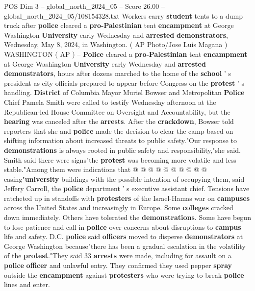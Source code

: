 \begin{textsample}{POS Dim 3 – global\_north\_2024\_05 – Score 26.00 – global\_north\_2024\_05/108154328.txt}  \label{ex:f3_pos_013}
Workers carry \textbf{student} tents to a dump truck after \textbf{police} cleared a \textbf{pro-Palestinian} tent \textbf{encampment} at George Washington \textbf{University} early Wednesday and \textbf{arrested} \textbf{demonstrators}, Wednesday, May 8, 2024, in Washington. ( AP Photo/Jose Luis Magana ) WASHINGTON ( AP ) -- \textbf{Police} cleared a \textbf{pro-Palestinian} tent \textbf{encampment} at George Washington \textbf{University} early Wednesday and \textbf{arrested} \textbf{demonstrators}, hours after dozens marched to the home of the \textbf{school} ' s president as city officials prepared to appear before Congress on the \textbf{protest} ' s handling. \textbf{District} of Columbia Mayor Muriel Bowser and Metropolitan \textbf{Police} Chief Pamela Smith were called to testify Wednesday afternoon at the Republican-led House Committee on Oversight and Accountability, but the \textbf{hearing} was canceled after the \textbf{arrests}.
After the \textbf{crackdown}, Bowser told reporters that she and \textbf{police} made the decision to clear the camp based on shifting information about increased threats to public safety."Our response to \textbf{demonstrations} is always rooted in public safety and responsibility,"she said.
Smith said there were signs"the \textbf{protest} was becoming more volatile and less stable."Among them were indications that @ @ @ @ @ @ @ @ @ @ casing"\textbf{university} buildings with the possible intention of occupying them, said Jeffery Carroll, the \textbf{police} department ' s executive assistant chief.
Tensions have ratcheted up in standoffs with \textbf{protesters} of the Israel-Hamas war on \textbf{campuses} across the United States and increasingly in Europe.
Some \textbf{colleges} cracked down immediately.
Others have tolerated the \textbf{demonstrations}.
Some have begun to lose patience and call in \textbf{police} over concerns about disruptions to \textbf{campus} life and safety.
D.C. \textbf{police} said \textbf{officers} moved to disperse \textbf{demonstrators} at George Washington because"there has been a gradual escalation in the volatility of the \textbf{protest}."They said 33 \textbf{arrests} were made, including for assault on a \textbf{police} \textbf{officer} and unlawful entry.
They confirmed they used pepper \textbf{spray} outside the \textbf{encampment} against \textbf{protesters} who were trying to break \textbf{police} lines and enter.

\end{textsample}
